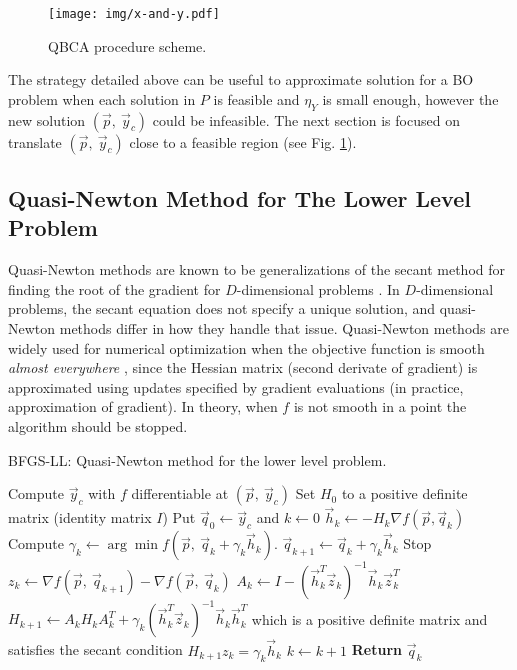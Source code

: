 \documentclass[conference]{IEEEtran}
\theoremstyle{definition}
\begin{document}
% 
\begin{figure}[!ht]
    \centering
    \texttt{[image: img/x-and-y.pdf]}
    \caption{QBCA procedure scheme.}
    \label{fig:qca}
\end{figure}
% 
The strategy detailed above can be useful to approximate solution for a BO problem
when each solution in  $P$ is feasible and $\eta_{Y}$ is small enough, however
the new solution $(\vec{p},\ \vec{y}_c)$ could be infeasible. The next section
is focused on translate $(\vec{p},\ \vec{y}_c)$ close to a feasible region
(see Fig. \ref{fig:qca}).


\subsection{Quasi-Newton Method for The Lower Level Problem} %
\label{sub:nonsmooth_optimization_via_bfgs}

Quasi-Newton methods are known to be generalizations of the secant method for
finding the root of the gradient for $D$-dimensional problems \cite{fletcher2013practical,liu1989limited}.
In $D$-dimensional problems, the secant equation does not specify a unique solution,
and quasi-Newton methods differ in how they handle that issue. Quasi-Newton methods
are widely used for numerical optimization when the objective function is smooth
\textit{almost everywhere} \cite{lewis2013nonsmooth}, since the Hessian matrix
(second derivate of gradient) is approximated using updates specified by gradient
evaluations (in practice, approximation of gradient). In theory, when $f$ is not
smooth in a point the algorithm should be stopped. 

\begin{algorithm}[!ht]
    \caption{BFGS-LL: Quasi-Newton method for the lower level problem.}
    \label{alg:BFGS-LL}
    \begin{algorithmic}[1]
        \STATE Compute $\vec{y}_c$ with $f$ differentiable at $(\vec{p},\ \vec{y}_c)$
        \STATE Set $H_0$ to a positive definite matrix (identity matrix $I$)
        \STATE Put $\vec{q}_0 \gets \vec{y}_c$ and $k \gets 0$
            \STATE $\vec{h}_k \gets -H_k\nabla f(\vec{p}, \vec{q}_k)$
            \STATE Compute $\gamma_{k}\gets\arg \min f(\vec{p}, \ \vec{q} _{k}+ \gamma_k \vec{h} _{k})$.
            \STATE $\vec{q}_{k+1} \gets \vec{q}_k  + \gamma_k \vec{h}_k$
                \STATE Stop
            \ENDIF
            \STATE $z_k \gets \nabla f(\vec{p}, \ \vec{q}_{k+1}) - \nabla f(\vec{p}, \ \vec{q}_{k}) $
            \STATE $\displaystyle A_k \gets I - (\vec{h}_k^T \vec{z}_k)^{-1} \vec{h}_k \vec{z}_k^T$
            \STATE $H_{k+1} \gets A_k H_k A_k^T + \gamma_k(\vec{h}_k^T\vec{z}_k)^{-1}\vec{h}_k \vec{h}_k^T$
                   which is a positive definite matrix and satisfies the secant
                   condition $H_{k+1} z_k = \gamma_k \vec{h}_k$
            \STATE $k \gets k + 1$
        \ENDWHILE
        \STATE \textbf{Return} $\vec{q}_k$
    \end{algorithmic}
\end{algorithm}
\end{document}
